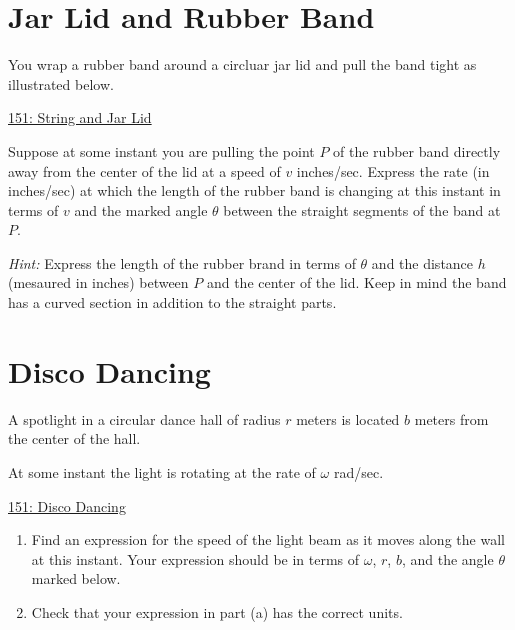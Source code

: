 \documentclass{ximera}
\begin{document}
\section{Jar Lid and Rubber Band}
\begin{question}  \label{Qbnmdfgh}
You wrap a rubber band around a circluar jar lid and pull the band tight as illustrated below.

 
\begin{onlineOnly}
   \begin{center}
\end{center}
\end{onlineOnly}

\href{https://www.desmos.com/calculator/jbku3wrtdq}{151: String and Jar Lid}

Suppose at some instant you are pulling the point $P$ of the rubber band directly away from the center of the lid at a speed of $v$ inches/sec. Express the rate (in inches/sec) at which the length of the rubber band is changing at this instant in terms of $v$ and the marked angle $\theta$ between the straight segments of the band at $P$.

\emph{Hint:} Express the length of the rubber brand in terms of $\theta$ and the distance $h$ (mesaured in inches) between $P$ and the center of the lid. Keep in mind the band has a curved section in addition to the straight parts.
\end{question}

\section{Disco Dancing}
\begin{question}  \label{QLKDKGDCCCC}
A spotlight in a circular dance hall of radius $r$ meters is located $b$ meters from the center of the hall. 

At some instant the light is rotating at the rate of $\omega$ rad/sec. 

\begin{onlineOnly}
   \begin{center}
\end{center}
\end{onlineOnly}

\href{https://www.desmos.com/calculator/m2o267u9ur}{151: Disco Dancing}


\begin{enumerate}
\item Find an expression for the speed of the light beam as it moves along the wall at this instant. Your expression should be in terms of $\omega$, $r$, $b$, and the angle $\theta$ marked below.

\item Check that your expression in  part (a) has the correct units.

\end{enumerate}

\end{question}
\end{document}
